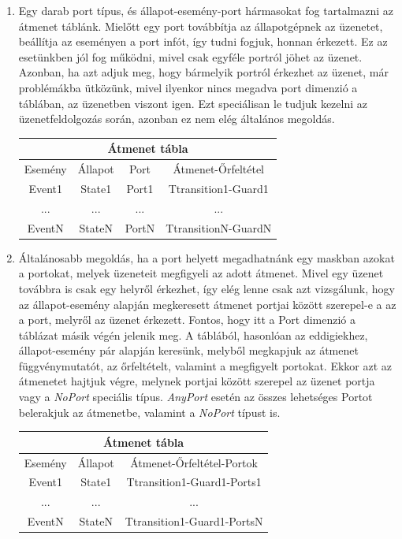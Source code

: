 \documentclass[a4paper,12pt]{report}
\begin{document}
\begin{enumerate}
\item Egy darab port típus, és állapot-esemény-port hármasokat fog tartalmazni az átmenet táblánk. Mielőtt egy port továbbítja az állapotgépnek az üzenetet, beállítja az eseményen a port infót, így tudni fogjuk, honnan érkezett. Ez az esetünkben jól fog működni, mivel csak egyféle portról jöhet az üzenet. Azonban, ha azt adjuk meg, hogy bármelyik portról érkezhet az üzenet, már problémákba ütközünk, mivel ilyenkor nincs megadva port dimenzió a táblában, az üzenetben viszont igen. Ezt speciálisan le tudjuk kezelni az üzenetfeldolgozás során, azonban ez nem elég általános megoldás. \\

\begin{center}
\begin{tabular}{@{}ccc|c@{}} \toprule
\multicolumn{4}{c}{Átmenet tábla} \\\midrule
Esemény & Állapot 	& Port 	& Átmenet-Őrfeltétel\\\midrule
Event1 	& State1 	& Port1 & Ttransition1-Guard1 \\
... 	& ... 		& ... 	& ... \\
EventN 	& StateN 	& PortN & TtransitionN-GuardN
\end{tabular}
\small
\end{center}
\item Általánosabb megoldás, ha a port helyett megadhatnánk egy maskban azokat a portokat, melyek üzeneteit megfigyeli az adott átmenet. Mivel egy üzenet továbbra is csak egy helyről érkezhet, így elég lenne csak azt vizsgálunk, hogy az állapot-esemény alapján megkeresett átmenet portjai között szerepel-e a az a port, melyről az üzenet érkezett. Fontos, hogy itt a Port dimenzió a táblázat másik végén jelenik meg. A táblából, hasonlóan az eddigiekhez, állapot-esemény pár alapján keresünk, melyből megkapjuk az átmenet függvénymutatót, az őrfeltételt, valamint a megfigyelt portokat. Ekkor azt az átmenetet hajtjuk végre, melynek portjai között szerepel az üzenet portja vagy a \textit{NoPort} speciális típus. \textit{AnyPort} esetén az összes lehetséges Portot belerakjuk az átmenetbe, valamint a \textit{NoPort} típust is. \\

\begin{center}
\begin{tabular}{@{}cc|c@{}} \toprule
\multicolumn{3}{c}{Átmenet tábla} \\\midrule
Esemény & Állapot 	&  Átmenet-Őrfeltétel-Portok\\\midrule
Event1 	& State1 	&  Ttransition1-Guard1-Ports1 \\
... 	& ... 	 	& ... \\
EventN 	& StateN 	& Ttransition1-Guard1-PortsN
\end{tabular}
\small
\end{center}
\end{enumerate}
\end{document}
